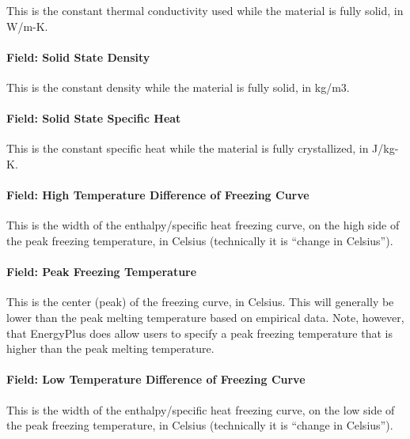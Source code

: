 This is the constant thermal conductivity used while the material is fully solid, in W/m-K.

\paragraph{Field: Solid State Density}\label{materialpropertyphasechangehysteresis-inputs-solidrho}

This is the constant density while the material is fully solid, in kg/m3.

\paragraph{Field: Solid State Specific Heat}\label{materialpropertyphasechangehysteresis-inputs-solid-state-specific-heat}

This is the constant specific heat while the material is fully crystallized, in J/kg-K.

\paragraph{Field: High Temperature Difference of Freezing Curve}\label{materialpropertyphasechangehysteresis-inputs-high-temperature-difference-of-freezing-curve}

This is the width of the enthalpy/specific heat freezing curve, on the high side of the peak freezing temperature, in Celsius (technically it is ``change in Celsius'').

\paragraph{Field: Peak Freezing Temperature}\label{materialpropertyphasechangehysteresis-inputs-peak-freezing-temperature}

This is the center (peak) of the freezing curve, in Celsius.  This will generally be lower than the peak melting temperature based on empirical data.  Note, however, that EnergyPlus does allow users to specify a peak freezing temperature that is higher than the peak melting temperature.

\paragraph{Field: Low Temperature Difference of Freezing Curve}\label{materialpropertyphasechangehysteresis-inputs-low-temperature-difference-of-freezing-curve}

This is the width of the enthalpy/specific heat freezing curve, on the low side of the peak freezing temperature, in Celsius (technically it is ``change in Celsius'').

